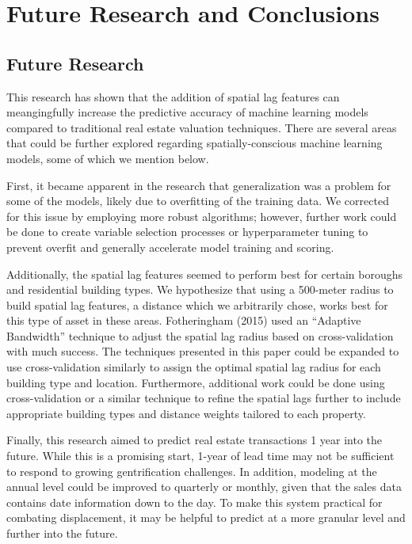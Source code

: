 \documentclass[12pt,]{article}
\begin{document}
\hypertarget{future-research-and-conclusions}{%
\section{Future Research and
Conclusions}\label{future-research-and-conclusions}}

\hypertarget{future-research}{%
\subsection{Future Research}\label{future-research}}

This research has shown that the addition of spatial lag features can
meangingfully increase the predictive accuracy of machine learning
models compared to traditional real estate valuation techniques. There
are several areas that could be further explored regarding
spatially-conscious machine learning models, some of which we mention
below.

First, it became apparent in the research that generalization was a
problem for some of the models, likely due to overfitting of the
training data. We corrected for this issue by employing more robust
algorithms; however, further work could be done to create variable
selection processes or hyperparameter tuning to prevent overfit and
generally accelerate model training and scoring.

Additionally, the spatial lag features seemed to perform best for
certain boroughs and residential building types. We hypothesize that
using a 500-meter radius to build spatial lag features, a distance which
we arbitrarily chose, works best for this type of asset in these areas.
Fotheringham (2015) used an ``Adaptive Bandwidth'' technique to adjust
the spatial lag radius based on cross-validation with much success. The
techniques presented in this paper could be expanded to use
cross-validation similarly to assign the optimal spatial lag radius for
each building type and location. Furthermore, additional work could be
done using cross-validation or a similar technique to refine the spatial
lags further to include appropriate building types and distance weights
tailored to each property.

Finally, this research aimed to predict real estate transactions 1 year
into the future. While this is a promising start, 1-year of lead time
may not be sufficient to respond to growing gentrification challenges.
In addition, modeling at the annual level could be improved to quarterly
or monthly, given that the sales data contains date information down to
the day. To make this system practical for combating displacement, it
may be helpful to predict at a more granular level and further into the
future.
\end{document}
